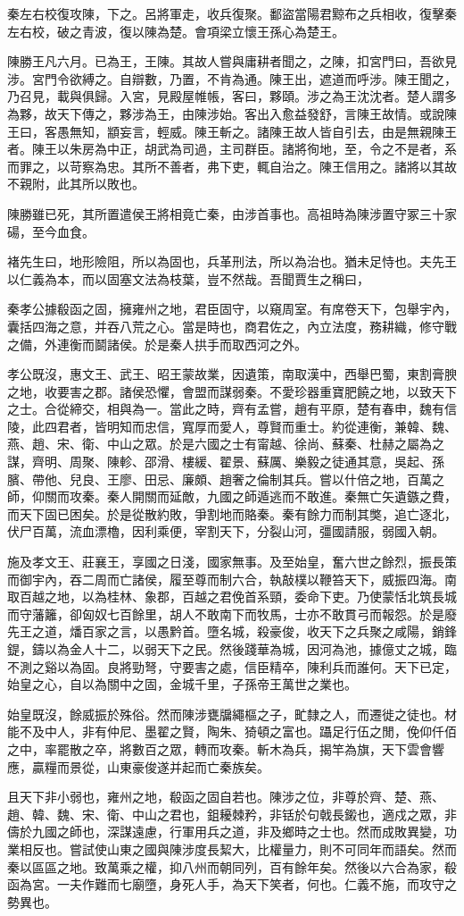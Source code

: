 秦左右校復攻陳，下之。呂將軍走，收兵復聚。鄱盜當陽君黥布之兵相收，復擊秦左右校，破之青波，復以陳為楚。會項梁立懷王孫心為楚王。

陳勝王凡六月。已為王，王陳。其故人嘗與庸耕者聞之，之陳，扣宮門曰，吾欲見涉。宮門令欲縛之。自辯數，乃置，不肯為通。陳王出，遮道而呼涉。陳王聞之，乃召見，載與俱歸。入宮，見殿屋帷帳，客曰，夥頤。涉之為王沈沈者。楚人謂多為夥，故天下傳之，夥涉為王，由陳涉始。客出入愈益發舒，言陳王故情。或說陳王曰，客愚無知，顓妄言，輕威。陳王斬之。諸陳王故人皆自引去，由是無親陳王者。陳王以朱房為中正，胡武為司過，主司群臣。諸將徇地，至，令之不是者，系而罪之，以苛察為忠。其所不善者，弗下吏，輒自治之。陳王信用之。諸將以其故不親附，此其所以敗也。

陳勝雖已死，其所置遣侯王將相竟亡秦，由涉首事也。高祖時為陳涉置守冢三十家碭，至今血食。

褚先生曰，地形險阻，所以為固也，兵革刑法，所以為治也。猶未足恃也。夫先王以仁義為本，而以固塞文法為枝葉，豈不然哉。吾聞賈生之稱曰，

秦孝公據殽函之固，擁雍州之地，君臣固守，以窺周室。有席卷天下，包舉宇內，囊括四海之意，并吞八荒之心。當是時也，商君佐之，內立法度，務耕織，修守戰之備，外連衡而鬬諸侯。於是秦人拱手而取西河之外。

孝公既沒，惠文王、武王、昭王蒙故業，因遺策，南取漢中，西舉巴蜀，東割膏腴之地，收要害之郡。諸侯恐懼，會盟而謀弱秦。不愛珍器重寶肥饒之地，以致天下之士。合從締交，相與為一。當此之時，齊有孟嘗，趙有平原，楚有春申，魏有信陵，此四君者，皆明知而忠信，寬厚而愛人，尊賢而重士。約從連衡，兼韓、魏、燕、趙、宋、衛、中山之眾。於是六國之士有甯越、徐尚、蘇秦、杜赫之屬為之謀，齊明、周聚、陳軫、邵滑、樓緩、翟景、蘇厲、樂毅之徒通其意，吳起、孫臏、帶他、兒良、王廖、田忌、廉頗、趙奢之倫制其兵。嘗以什倍之地，百萬之師，仰關而攻秦。秦人開關而延敵，九國之師遁逃而不敢進。秦無亡矢遺鏃之費，而天下固已困矣。於是從散約敗，爭割地而賂秦。秦有餘力而制其獘，追亡逐北，伏尸百萬，流血漂櫓，因利乘便，宰割天下，分裂山河，彊國請服，弱國入朝。

施及孝文王、莊襄王，享國之日淺，國家無事。及至始皇，奮六世之餘烈，振長策而御宇內，吞二周而亡諸侯，履至尊而制六合，執敲樸以鞭笞天下，威振四海。南取百越之地，以為桂林、象郡，百越之君俛首系頸，委命下吏。乃使蒙恬北筑長城而守藩籬，卻匈奴七百餘里，胡人不敢南下而牧馬，士亦不敢貫弓而報怨。於是廢先王之道，燔百家之言，以愚黔首。墮名城，殺豪俊，收天下之兵聚之咸陽，銷鋒鍉，鑄以為金人十二，以弱天下之民。然後踐華為城，因河為池，據億丈之城，臨不測之谿以為固。良將勁弩，守要害之處，信臣精卒，陳利兵而誰何。天下已定，始皇之心，自以為關中之固，金城千里，子孫帝王萬世之業也。

始皇既沒，餘威振於殊俗。然而陳涉甕牖繩樞之子，甿隸之人，而遷徙之徒也。材能不及中人，非有仲尼、墨翟之賢，陶朱、猗頓之富也。躡足行伍之閒，俛仰仟佰之中，率罷散之卒，將數百之眾，轉而攻秦。斬木為兵，揭竿為旗，天下雲會響應，贏糧而景從，山東豪俊遂并起而亡秦族矣。

且天下非小弱也，雍州之地，殽函之固自若也。陳涉之位，非尊於齊、楚、燕、趙、韓、魏、宋、衛、中山之君也，鉏耰棘矜，非铦於句戟長鎩也，適戍之眾，非儔於九國之師也，深謀遠慮，行軍用兵之道，非及鄉時之士也。然而成敗異變，功業相反也。嘗試使山東之國與陳涉度長絜大，比權量力，則不可同年而語矣。然而秦以區區之地。致萬乘之權，抑八州而朝同列，百有餘年矣。然後以六合為家，殽函為宮。一夫作難而七廟墮，身死人手，為天下笑者，何也。仁義不施，而攻守之勢異也。